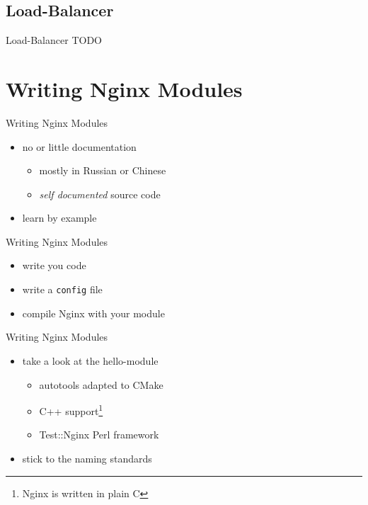 \documentclass{beamer}
\begin{document}
\subsection{Load-Balancer}

\begin{frame}{Load-Balancer}
TODO 
\end{frame}

\section{Writing Nginx Modules}
 
\begin{frame}{Writing Nginx Modules}
\begin{itemize}
 \item no or little documentation
 \begin{itemize}
  \item mostly in Russian or Chinese
  \item \emph{self documented} source code
 \end{itemize}
 \item learn by example
\end{itemize}
\end{frame}

\begin{frame}[fragile]{Writing Nginx Modules}
\begin{itemize}
 \item write you code
 \item write a \verb|config| file
 \item compile Nginx with your module
\end{itemize}
\end{frame}

\begin{frame}{Writing Nginx Modules}
\begin{itemize}
 \item take a look at the hello-module
 \begin{itemize}
  \item autotools adapted to CMake
  \item C++ support\footnote{Nginx is written in plain C}
  \item Test::Nginx Perl framework
 \end{itemize}
\item stick to the naming standards
\end{itemize}
\end{frame}
\end{document}
